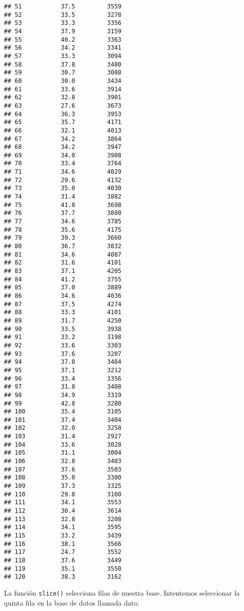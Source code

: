\documentclass[]{book}
\begin{document}
\begin{verbatim}
## 51           37.5         3559
## 52           33.5         3278
## 53           33.3         3356
## 54           37.9         3159
## 55           40.2         3363
## 56           34.2         3341
## 57           33.3         3094
## 58           37.8         3480
## 59           30.7         3088
## 60           30.0         3434
## 61           33.6         3914
## 62           32.8         3901
## 63           27.6         3673
## 64           36.3         3953
## 65           35.7         4171
## 66           32.1         4013
## 67           34.2         3864
## 68           34.2         3947
## 69           34.0         3908
## 70           33.4         3764
## 71           34.6         4029
## 72           29.6         4132
## 73           35.0         4030
## 74           31.4         3882
## 75           41.8         3698
## 76           37.7         3880
## 77           34.6         3785
## 78           35.6         4175
## 79           39.3         3660
## 80           36.7         3832
## 81           34.6         4087
## 82           31.6         4101
## 83           37.1         4205
## 84           41.2         3755
## 85           37.0         3889
## 86           34.6         4036
## 87           37.5         4274
## 88           33.3         4101
## 89           31.7         4250
## 90           33.5         3938
## 91           33.2         3198
## 92           33.6         3303
## 93           37.6         3207
## 94           37.8         3484
## 95           37.1         3212
## 96           33.4         3356
## 97           31.8         3408
## 98           34.9         3319
## 99           42.8         3280
## 100          35.4         3105
## 101          37.4         3404
## 102          32.0         3258
## 103          31.4         2927
## 104          33.6         3028
## 105          31.1         3004
## 106          32.8         3403
## 107          37.6         3503
## 108          35.0         3300
## 109          37.3         3325
## 110          29.8         3160
## 111          34.1         3553
## 112          30.4         3614
## 113          32.8         3208
## 114          34.1         3595
## 115          33.2         3439
## 116          38.1         3566
## 117          24.7         3552
## 118          37.6         3449
## 119          35.1         3550
## 120          38.3         3162
\end{verbatim}

La función \texttt{slice()} selecciona filas de nuestra base. Intentemos seleccionar la quinta fila en la base de datos llamada data:
\end{document}
